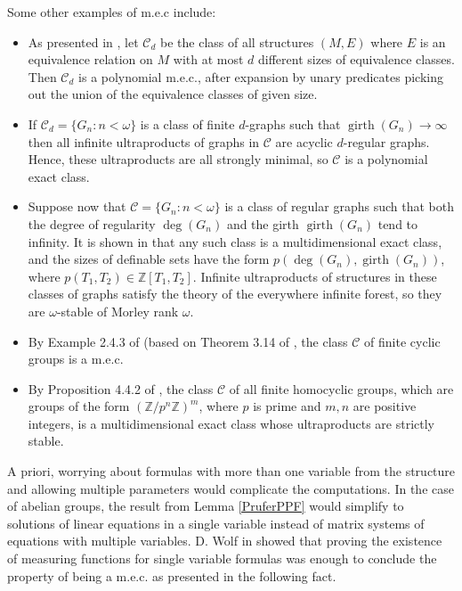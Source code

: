 \documentclass[11pt]{amsart}
\theoremstyle{definition}
\newcommand{\bitem}{\begin{itemize}}
\newcommand{\eitem}{\end{itemize}}
\newcommand{\Z}{\mathbb{Z}}
\begin{document}
Some other examples of m.e.c include: 
\bitem
\item As presented in \cite{AMSW}, let $\mathcal{C}_d$ be the class of all structures $(M,E)$ where $E$ is an equivalence relation on $M$ with at most $d$ different sizes of equivalence classes. Then $\mathcal{C}_d$ is a polynomial m.e.c., after expansion by unary predicates picking out the union of the equivalence classes of given size.
\item If $\mathcal{C}_d=\{G_n:n<\omega\}$ is a class of finite $d$-graphs such that $\operatorname{girth}(G_n)\to \infty$ then all infinite ultraproducts of graphs in $\mathcal{C}$ are acyclic $d$-regular graphs. Hence, these ultraproducts are all strongly minimal, so $\mathcal{C}$ is a polynomial exact class.
\item Suppose now that $\mathcal{C}=\{G_n:n<\omega\}$ is a class of regular graphs such that both the degree of regularity $\operatorname{deg}(G_n)$ and the girth $\operatorname{girth}(G_n)$ tend to infinity. It is shown in \cite{Garcia-Robles} that any such class is a multidimensional exact class, and the sizes of definable sets have the form $p(\operatorname{deg}(G_n),\operatorname{girth}(G_n))$, where $p(T_1,T_2)\in \mathbb{Z}[T_1,T_2]$. Infinite ultraproducts of structures in these classes of graphs satisfy the theory of the everywhere infinite forest, so they are $\omega$-stable of Morley rank $\omega$.
\item By Example 2.4.3 of \cite{Wolf-MEC} (based on Theorem 3.14 of \cite{Macpherson-Steinhorn}, the class $\mathcal{C}$ of finite cyclic groups is a m.e.c. 
\item By Proposition 4.4.2 of \cite{Garcia-Macpherson-Steinhorn}, the class $\mathcal{C}$ of all finite homocyclic groups, which are groups of the form $(\Z/p^n\Z)^m$, where $p$ is prime and $m,n$ are positive integers, is a multidimensional exact class whose ultraproducts are strictly stable.

\eitem

A priori, worrying about formulas with more than one variable from the structure and allowing multiple parameters would complicate the computations. In the case of abelian groups, the result from Lemma \ref{PruferPPF} would simplify to solutions of linear equations in a single variable instead of matrix systems of equations with multiple variables. D. Wolf in \cite{Wolf-MEC} showed that proving the existence of measuring functions for single variable formulas was enough to conclude the property of being a m.e.c. as presented in the following fact.
\end{document}
